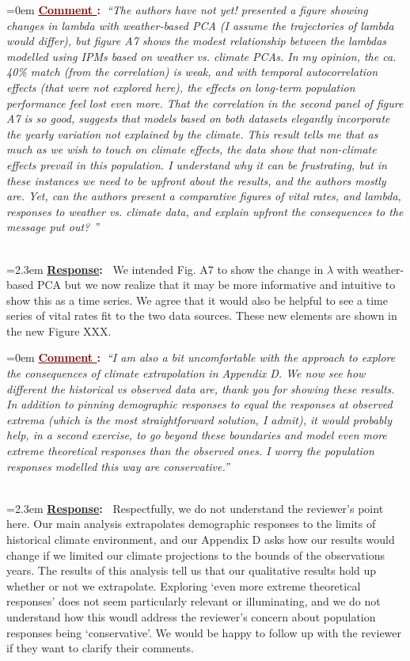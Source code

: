 \documentclass[12pt]{article}
\newcounter{cN}
\newcommand{\comment}[1]{
	\vspace{2em}
	\refstepcounter{cN} %
	\noindent \hangindent=0em \textbf{\textcolor{Maroon}{\uline{Comment \thecN}:~}}\emph{``#1''}
	}
\newcommand{\response}[1]{
	\\[0.25em]
	\hangindent=2.3em \textbf{\textcolor{NavyBlue}{\uline{Response}:~}}#1
	}
\begin{document}
\comment{The authors have not yet! presented a figure showing changes in lambda with weather-based PCA (I assume the trajectories of lambda would differ), but figure A7 shows the modest relationship between the lambdas modelled using IPMs based on weather vs. climate PCAs. In my opinion, the ca. 40\% match (from the correlation) is weak, and with temporal autocorrelation effects (that were not explored here), the effects on long-term population performance feel lost even more. That the correlation in the second panel of figure A7 is so good, suggests that models based on both datasets elegantly incorporate the yearly variation not explained by the climate. This result tells me that as much as we wish to touch on climate effects, the data show that non-climate effects prevail in this population. I understand why it can be frustrating, but in these instances we need to be upfront about the results, and the authors mostly are. Yet, can the authors present a comparative figures of vital rates, and lambda, responses to weather vs. climate data, and explain upfront the consequences to the message put out? 
}
\response{
We intended Fig. A7 to show the change in $\lambda$ with weather-based PCA but we now realize that it may be more informative and intuitive to show this as a time series. 
We agree that it would also be helpful to see a time series of vital rates fit to the two data sources.
These new elements are shown in the new Figure XXX. 

}

\comment{I am also a bit uncomfortable with the approach to explore the consequences of climate extrapolation in Appendix D. We now see how different the historical vs observed data are, thank you for showing these results. In addition to pinning demographic responses to equal the responses at observed extrema (which is the most straightforward solution, I admit), it would probably help, in a second exercise, to go beyond these boundaries and model even more extreme theoretical responses than the observed ones. I worry the population responses modelled this way are conservative.}
\response{
Respectfully, we do not understand the reviewer's point here. 
Our main analysis extrapolates demographic responses to the limits of historical climate environment, and our Appendix D asks how our results would change if we limited our climate projections to the bounds of the observations years. 
The results of this analysis tell us that our qualitative results hold up whether or not we extrapolate.
Exploring `even more extreme theoretical responses' does not seem particularly relevant or illuminating, and we do not understand how this woudl address the reviewer's concern about population responses being `conservative'. 
We would be happy to follow up with the reviewer if they want to clarify their comments.
}
\end{document}
